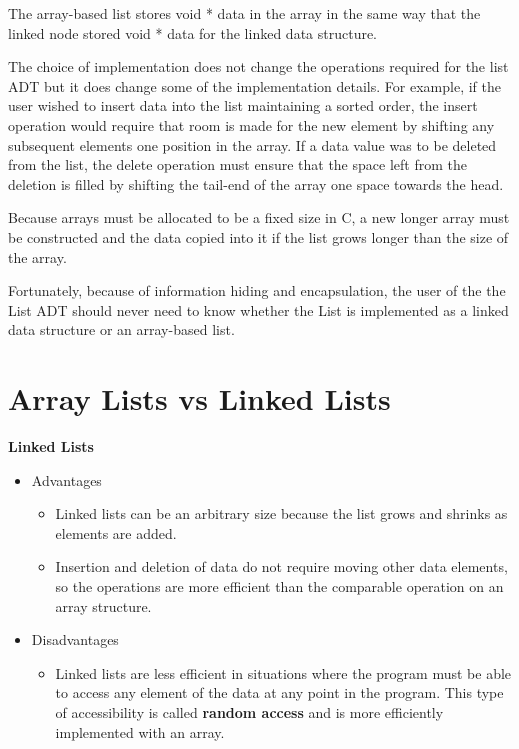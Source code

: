 The array-based list stores void * data in the array in the same way that the linked node stored void * data for the linked data structure.

The choice of implementation does not change the operations required for the list ADT but it does change some of the implementation details.   For example,  if the user wished to insert data into the list maintaining a sorted order, the insert operation would require that room is made for the new element by shifting any subsequent elements one position in the array.   If a data value was to be deleted from the list,  the delete operation must ensure that the space left from the deletion is filled by shifting the tail-end of the array one space towards the head.     

Because arrays must be allocated to be a fixed size in C,  a new longer array must be constructed and the data copied into it if the list grows longer than the size of the array.

Fortunately,  because of information hiding and encapsulation,  the user of the the List ADT should never need to know whether the List is implemented as a linked data structure or an array-based list.


\section{ Array Lists vs Linked Lists}   

\textbf{Linked Lists}
\begin{itemize}
\item Advantages
\begin{itemize}
\item Linked lists can be an arbitrary size because the list grows and  shrinks as elements are added.     
\item Insertion and deletion of data do not require moving  other  data elements, so the operations are more efficient than the comparable operation  on an array structure. 
\end{itemize}
\item Disadvantages
\begin{itemize}
\item Linked lists are less efficient in situations where the program must be able to access any element of the data at any point in the program.  This type of accessibility is called \textbf{random access} and is more efficiently implemented with an array.
\end{itemize}    
\end{itemize}  

